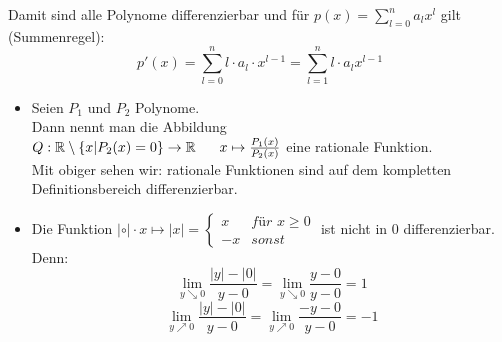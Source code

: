 Damit sind alle Polynome differenzierbar und für 
$p(x) = \sum_{l=0}^{n} a_l x^l$ gilt (Summenregel):
\begin{equation*}p'(x) = \sum_{l = 0}^n l \cdot a_l \cdot x^{l-1} 
= \sum_{l=1}^n l \cdot a_l x^{l-1}
\end{equation*}

\begin{itemize}
	\item Seien $P_1$ und $P_2$ Polynome. \\
	Dann nennt man die Abbildung \\
	\noindent\hspace*{5mm}$Q : \mathbb{R}\setminus\{x|P_2(x) = 0\}
	\rightarrow \mathbb{R} \\
	\noindent\hspace*{6mm}x \mapsto \frac{P_1(x)}{P_2(x)}$ 
	eine rationale Funktion. \\
	Mit obiger sehen wir: rationale Funktionen sind auf dem kompletten
	 Definitionsbereich differenzierbar.
	 
	\item Die Funktion $|\circ | \cdot x \mapsto |x| = \begin{cases}x  & \textit{für } x\geq 0 \\ - x & sonst \end{cases}$
	ist nicht in 0 differenzierbar. Denn:
	\begin{equation*}
	\lim\limits_{y \searrow 0}{\frac{|y|-|0|}{y-0}}
	= \lim\limits_{y \searrow 0}{\frac{y-0}{y-0}} = 1 
	\end{equation*}
	\begin{equation*}
	\lim\limits_{y \nearrow 0}{\frac{|y| -|0|}{y-0}} = \lim\limits_{y 
	\nearrow 0}{\frac{-y-0}{y-0}} = -1
	\end{equation*}
\end{itemize}

